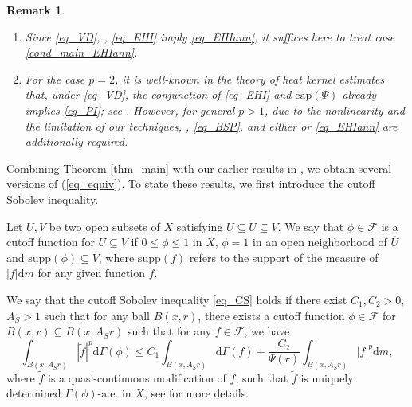 \documentclass[10pt,a4paper]{amsart}
\numberwithin{equation}{section}
\newtheorem{remark}[theorem]{Remark}
\begin{document}
\begin{remark}
\begin{enumerate}[label=(\arabic*)]
\item Since \ref{eq_VD}, \hyperlink{eq_LLC}{}, \ref{eq_EHI} imply \ref{eq_EHIann}, it suffices here to treat case \ref{cond_main_EHIann}.
\item For the case $p=2$, it is well-known in the theory of heat kernel estimates that, under \ref{eq_VD}, the conjunction of \ref{eq_EHI} and \hyperlink{eq_cap}{$\text{cap}(\Psi)$} already implies \ref{eq_PI}; see \cite[THEOREM 1.2]{GHL15}. However, for general $p>1$, due to the \emph{nonlinearity} and the limitation of our techniques, \hyperlink{eq_LSC}{}, \ref{eq_BSP}, and either \hyperlink{eq_LLC}{} or \ref{eq_EHIann} are additionally required.
\end{enumerate}
\end{remark}

Combining Theorem \ref{thm_main} with our earlier results in \cite{Yan25d}, we obtain several versions of (\ref{eq_equiv}). To state these results, we first introduce the cutoff Sobolev inequality.

Let $U,V$ be two open subsets of $X$ satisfying $U\subseteq\overline{U}\subseteq V$. We say that $\phi\in\mathcal{F}$ is a cutoff function for $U\subseteq V$ if $0\le\phi\le1$ in $X$, $\phi=1$ in an open neighborhood of $\overline{U}$ and $\mathrm{supp}(\phi)\subseteq V$, where $\mathrm{supp}(f)$ refers to the support of the measure of $|f|\mathrm{d} m$ for any given function $f$.

We say that the cutoff Sobolev inequality \ref{eq_CS} holds if there exist $C_{1},C_{2}>0$, $A_{S}>1$ such that for any ball $B(x,r)$, there exists a cutoff function $\phi\in\mathcal{F}$ for $B(x,r)\subseteq B(x,A_Sr)$ such that for any $f\in\mathcal{F}$, we have
\begin{equation*}\label{eq_CS}\tag*{CS($\Psi$)}
\int_{B(x,A_{S}r)}|\widetilde{f}|^p\mathrm{d}\Gamma(\phi)\le C_{1}\int_{B(x,A_{S}r)}\mathrm{d}\Gamma(f)+\frac{C_{2}}{\Psi(r)}\int_{B(x,A_{S}r)}|f|^p\mathrm{d} m,
\end{equation*}
where $\widetilde{f}$ is a quasi-continuous modification of $f$, such that $\widetilde{f}$ is uniquely determined $\Gamma(\phi)$-a.e. in $X$, see \cite[Section 8]{Yan25a} for more details.

\end{document}
